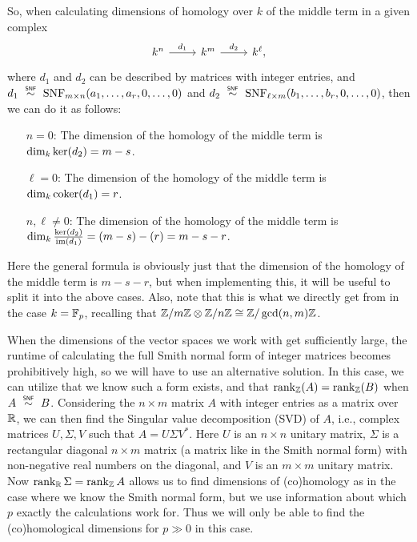 So, when calculating dimensions of homology over $k$ of the middle term in a given complex
\[
  \begin{tikzcd}
    k^{n} \ar[r,"d_{1}"] & k^{m} \ar[r,"d_{2}"] & k^{\ell},
  \end{tikzcd}
\]
where $d_{1}$ and $d_{2}$ can be described by matrices with integer entries, and $d_{1} \snfsim \SNF_{m \times n}(a_{1},\dotsc,a_{r},0,\dotsc,0)$ and $d_{2} \snfsim \SNF_{\ell \times m}(b_{1},\dotsc,b_{r},0,\dotsc,0)$, then we can do it as follows:
\begin{enumerate}[align=left]
  \item[$n=0$:] The dimension of the homology of the middle term is $\dim_{k} \operatorname{ker}(d_{2}) = m-s$.
  \item[$\ell=0$:] The dimension of the homology of the middle term is $\dim_{k} \operatorname{coker}(d_{1}) = r$.
  \item[$n,\ell \neq 0$:] The dimension of the homology of the middle term is $\dim_{k} \frac{\operatorname{ker}(d_{2})}{\operatorname{im}(d_{1})} = (m-s) - (r) = m-s-r$.
\end{enumerate}

\begin{remark}
  Here the general formula is obviously just that the dimension of the homology of the middle term is $m-s-r$, but when implementing this, it will be useful to split it into the above cases. Also, note that this is what we directly get from  in the case $k = \mathbb{F}_{p}$, recalling that $\mathbb{Z}/m\mathbb{Z} \otimes \mathbb{Z}/n\mathbb{Z} \cong \mathbb{Z}/\gcd(n,m)\mathbb{Z}$.
\end{remark}

\begin{remark}
  When the dimensions of the vector spaces we work with get sufficiently large, the runtime of calculating the full Smith normal form of integer matrices becomes prohibitively high, so we will have to use an alternative solution. In this case, we can utilize that we know such a form exists, and that $\operatorname{rank}_{\mathbb{Z}}(A) = \operatorname{rank}_{\mathbb{Z}}(B)$ when $A \snfsim B$. Considering the $n \times m$ matrix $A$ with integer entries as a matrix over $\mathbb{R}$, we can then find the Singular value decomposition (SVD) of $A$, i.e., complex matrices $U,\Sigma,V$ such that $A = U\Sigma V^{*}$. Here $U$ is an $n \times n$ unitary matrix, $\Sigma$ is a rectangular diagonal $n \times m$ matrix (a matrix like in the Smith normal form) with non-negative real numbers on the diagonal, and $V$ is an $m \times m$ unitary matrix. Now $\operatorname{rank}_{\mathbb{R}} \Sigma = \operatorname{rank}_{\mathbb{Z}} A$ allows us to find dimensions of (co)homology as in the case where we know the Smith normal form, but we use information about which $p$ exactly the calculations work for. Thus we will only be able to find the (co)homological dimensions for $p \gg 0$ in this case.
\end{remark}

